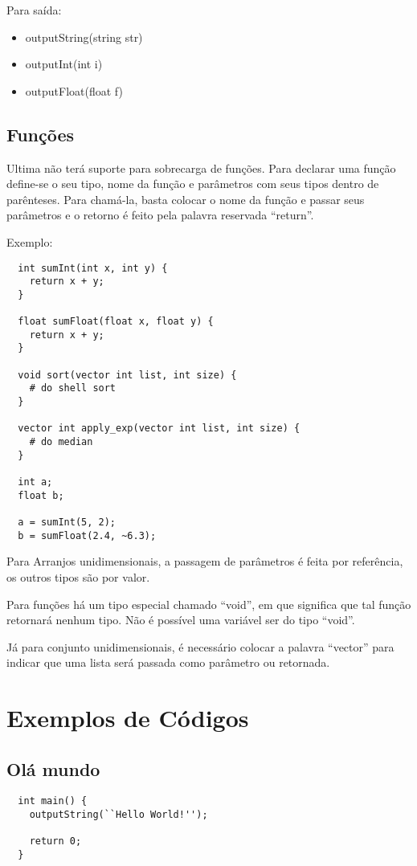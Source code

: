 \documentclass[a4paper, 11pt, article]{memoir}
\begin{document}
Para saída:
\begin{itemize}
\item outputString(string str)
\item outputInt(int i)
\item outputFloat(float f)
\end{itemize}

\subsection{Funções}
\label{subsec:function}
Ultima não terá suporte para sobrecarga de funções. Para declarar uma função
define-se o seu tipo, nome da função e parâmetros com seus tipos dentro de
parênteses.
Para chamá-la, basta colocar o nome da função e passar seus parâmetros e o
retorno é feito pela palavra reservada ``return''.

Exemplo:
\begin{lstlisting}
  int sumInt(int x, int y) {
    return x + y;
  }

  float sumFloat(float x, float y) {
    return x + y;
  }

  void sort(vector int list, int size) {
    # do shell sort
  }

  vector int apply_exp(vector int list, int size) {
    # do median
  }

  int a;
  float b;

  a = sumInt(5, 2);
  b = sumFloat(2.4, ~6.3);
\end{lstlisting}

Para Arranjos unidimensionais, a passagem de parâmetros é feita por referência,
os outros tipos são por valor.

Para funções há um tipo especial chamado ``void'', em que significa que tal
função retornará nenhum tipo. Não é possível uma variável ser do tipo ``void''.

Já para conjunto unidimensionais, é necessário colocar a palavra ``vector'' para
indicar que uma lista será passada como parâmetro ou retornada.
\section{Exemplos de Códigos}
\label{sec:code}

\subsection{Olá mundo}
\label{subsec:helloworld}
\begin{lstlisting}
  int main() {
    outputString(``Hello World!'');

    return 0;
  }
\end{lstlisting}
\end{document}
